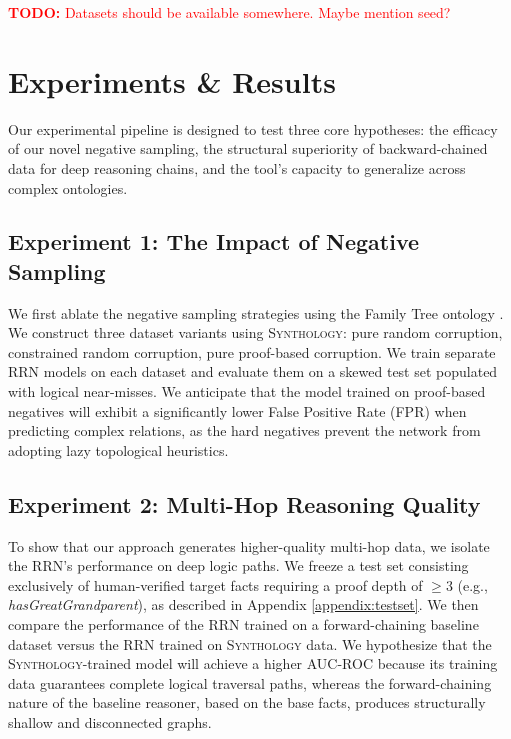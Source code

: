 \documentclass{IOS-Book-Article}     %
\newcommand{\todo}[1]{\textcolor{red}{\textbf{TODO:} #1}}
\begin{document}
\todo{Datasets should be available somewhere. Maybe mention seed?}

\section{Experiments \& Results}

Our experimental pipeline is designed to test three core hypotheses: the efficacy of our novel negative sampling, the structural superiority of backward-chained data for deep reasoning chains, and the tool's capacity to generalize across complex ontologies.

\subsection{Experiment 1: The Impact of Negative Sampling}
We first ablate the negative sampling strategies using the Family Tree ontology \cite{hohenecker2020ontology}. We construct three dataset variants using \textsc{Synthology}: pure random corruption, constrained random corruption, pure proof-based corruption. We train separate RRN models on each dataset and evaluate them on a skewed test set populated with logical near-misses. We anticipate that the model trained on proof-based negatives will exhibit a significantly lower False Positive Rate (FPR) when predicting complex relations, as the hard negatives prevent the network from adopting lazy topological heuristics.

\subsection{Experiment 2: Multi-Hop Reasoning Quality}
To show that our approach generates higher-quality multi-hop data, we isolate the RRN's performance on deep logic paths. We freeze a test set consisting exclusively of human-verified target facts requiring a proof depth of $\geq 3$ (e.g., \textit{hasGreatGrandparent}), as described in Appendix \ref{appendix:testset}. We then compare the performance of the RRN trained on a forward-chaining baseline dataset versus the RRN trained on \textsc{Synthology} data. We hypothesize that the \textsc{Synthology}-trained model will achieve a higher AUC-ROC because its training data guarantees complete logical traversal paths, whereas the forward-chaining nature of the baseline reasoner, based on the base facts, produces structurally shallow and disconnected graphs.
\end{document}
